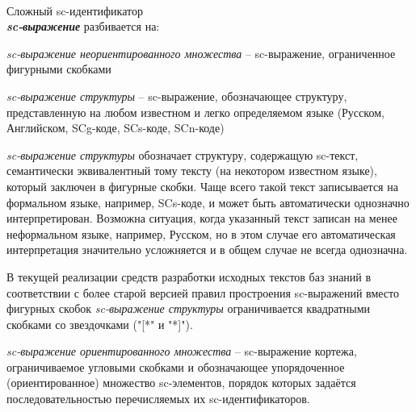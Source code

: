 \begin{frame}{\\Сложный sc-идентификатор}
	\topline
	\justifying
	\vspace*{\fill}\\
	\scriptsize
		\textbf{\textit{sc-выражение}} разбивается на:
		\begin{textitemize}
			\item \textit{sc-выражение неориентированного множества} -- sc-выражение, ограниченное фигурными скобками
			\item \textit{sc-выражение структуры} -- sc-выражение, обозначающее структуру, представленную на любом известном и легко определяемом языке (Русском, Английском, SCg-коде, SCs-коде, SCn-коде)
			
			\textit{sc-выражение структуры} обозначает структуру, содержащую sc-текст, семантически эквивалентный тому тексту (на некотором известном языке), который заключен в фигурные скобки. Чаще всего такой текст записывается на формальном языке, например, SCs-коде, и может быть автоматически однозначно интерпретирован. Возможна ситуация, когда указанный текст записан на менее неформальном языке, например, Русском, но в этом случае его автоматическая интерпретация значительно усложняется и в общем случае не всегда однозначна.
			
			В текущей реализации средств разработки исходных текстов баз знаний в соответствии с более старой версией правил простроения sc-выражений вместо фигурных скобок \textit{sc-выражение структуры} ограничивается квадратными скобками со звездочками ("[*"{} и "*]"{}).
		
			\item \textit{sc-выражение ориентированного множества} -- sc-выражение кортежа, ограничиваемое угловыми скобками и обозначающее упорядоченное (ориентированное) множество sc-элементов, порядок которых задаётся последовательностью перечисляемых их sc-идентификаторов.	
		\end{textitemize}	
\end{frame}

